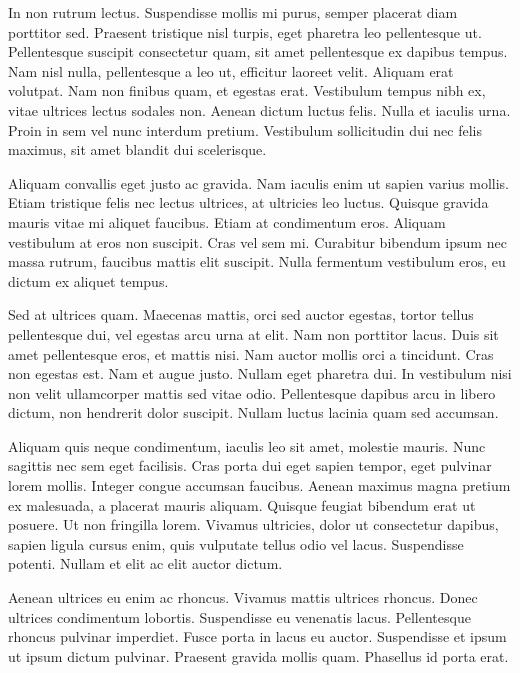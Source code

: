 \documentclass[a4paper, 12pt]{article}
\begin{document}
	In non rutrum lectus. Suspendisse mollis mi purus, semper placerat diam porttitor sed. Praesent tristique nisl turpis, eget pharetra leo pellentesque ut. Pellentesque suscipit consectetur quam, sit amet pellentesque ex dapibus tempus. Nam nisl nulla, pellentesque a leo ut, efficitur laoreet velit. Aliquam erat volutpat. Nam non finibus quam, et egestas erat. Vestibulum tempus nibh ex, vitae ultrices lectus sodales non. Aenean dictum luctus felis. Nulla et iaculis urna. Proin in sem vel nunc interdum pretium. Vestibulum sollicitudin dui nec felis maximus, sit amet blandit dui scelerisque.
	
	Aliquam convallis eget justo ac gravida. Nam iaculis enim ut sapien varius mollis. Etiam tristique felis nec lectus ultrices, at ultricies leo luctus. Quisque gravida mauris vitae mi aliquet faucibus. Etiam at condimentum eros. Aliquam vestibulum at eros non suscipit. Cras vel sem mi. Curabitur bibendum ipsum nec massa rutrum, faucibus mattis elit suscipit. Nulla fermentum vestibulum eros, eu dictum ex aliquet tempus.
	
	Sed at ultrices quam. Maecenas mattis, orci sed auctor egestas, tortor tellus pellentesque dui, vel egestas arcu urna at elit. Nam non porttitor lacus. Duis sit amet pellentesque eros, et mattis nisi. Nam auctor mollis orci a tincidunt. Cras non egestas est. Nam et augue justo. Nullam eget pharetra dui. In vestibulum nisi non velit ullamcorper mattis sed vitae odio. Pellentesque dapibus arcu in libero dictum, non hendrerit dolor suscipit. Nullam luctus lacinia quam sed accumsan.
	
	Aliquam quis neque condimentum, iaculis leo sit amet, molestie mauris. Nunc sagittis nec sem eget facilisis. Cras porta dui eget sapien tempor, eget pulvinar lorem mollis. Integer congue accumsan faucibus. Aenean maximus magna pretium ex malesuada, a placerat mauris aliquam. Quisque feugiat bibendum erat ut posuere. Ut non fringilla lorem. Vivamus ultricies, dolor ut consectetur dapibus, sapien ligula cursus enim, quis vulputate tellus odio vel lacus. Suspendisse potenti. Nullam et elit ac elit auctor dictum.
	
	Aenean ultrices eu enim ac rhoncus. Vivamus mattis ultrices rhoncus. Donec ultrices condimentum lobortis. Suspendisse eu venenatis lacus. Pellentesque rhoncus pulvinar imperdiet. Fusce porta in lacus eu auctor. Suspendisse et ipsum ut ipsum dictum pulvinar. Praesent gravida mollis quam. Phasellus id porta erat.
	
\end{document}
